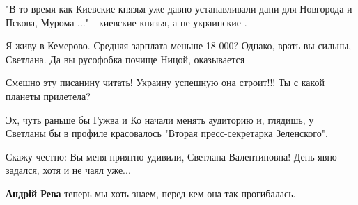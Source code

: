 \begin{itemize}
"В то время как Киевские князья уже давно устанавливали дани для Новгорода и Пскова, Мурома ..." - киевские князья, а не украинские \Smiley[1.0][yellow] .

 
Я живу в Кемерово. Средняя зарплата меньше 18 000? Однако, врать вы сильны, Светлана. Да вы русофобка почище Ницой, оказывается

 
Смешно эту писанину читать! Украину успешную она строит!!! Ты с какой планеты прилетела?

 
Эх, чуть раньше бы Гужва и Ко начали менять аудиторию и, глядишь, у Светланы бы в профиле красовалось "Вторая пресс-секретарка Зеленского".

 
Скажу честно: Вы меня приятно удивили, Светлана Валентиновна! День явно задался, хотя и не чаял уже...

\begin{itemize}
 
\textbf{Андрій Рева} теперь мы хоть знаем, перед кем она так прогибалась.
\end{itemize}

 

\end{itemize}
